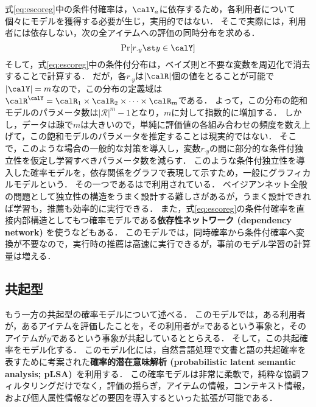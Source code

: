 式\eqref{eq:escoreg}中の条件付確率は，$\calY_a$に依存するため，各利用者について個々にモデルを獲得する必要が生じ，実用的ではない．
そこで実際には，利用者には依存しない，次の全アイテムへの評価の同時分布を求める．
\begin{equation}
\Pr[r_{\cdot y}\st y\in \calY]
\label{eq:jprob}
\end{equation}
そして，式\eqref{eq:escoreg}中の条件付分布は，ベイズ則と不要な変数を周辺化で消去することで計算する．
だが，各$r_{\cdot y}$は$|\calR|$個の値をとることが可能で$|\calY|=m$なので，この分布の定義域は$\calR^{\calY}=\calR_{1}\times\calR_{2}\times\dotsb\times\calR_{m}$である．
よって，この分布の飽和モデルのパラメータ数は$|\mathcal{R}|^m-1$となり，$m$に対して指数的に増加する．
しかし，データは疎で$m$は大きいので，単純に評価値の各組み合わせの頻度を数え上げて，この飽和モデルのパラメータを推定することは現実的ではない．
そこで，このような場合の一般的な対策を導入し，変数$r_{\cdot y}$の間に部分的な条件付独立性を仮定し学習すべきパラメータ数を減らす．
このような条件付独立性を導入した確率モデルを，依存関係をグラフで表現して示すため，一般にグラフィカルモデルという．
その一つである\cite{jb:037:00}は\cite{uai:98:01}で利用されている．
ベイジアンネット全般の問題として独立性の構造をうまく設計する難しさがあるが，うまく設計できれば学習も，推薦も効率的に実行できる．
また，式\eqref{eq:escoreg}の条件付確率を直接内部構造としてもつ確率モデルである\textbf{依存性ネットワーク (dependency network) }を使う\cite{jmlr:00:01}などもある．
このモデルでは，同時確率から条件付確率へ変換が不要なので，実行時の推薦は高速に実行できるが，事前のモデル学習の計算量は増える．

\subsection{共起型}

もう一方の共起型の確率モデルについて述べる．
このモデルでは，ある利用者が，あるアイテムを評価したことを，その利用者が$x$であるという事象と，そのアイテムが$y$であるという事象が共起しているととらえる．
そして，この共起確率をモデル化する．
このモデル化には，自然言語処理で文書と語の共起確率を表すために考案された\textbf{確率的潜在意味解析 (probabilistic latent semantic analysis; pLSA)}~\cite{uai:99:01}を利用する．
この確率モデルは非常に柔軟で，純粋な協調フィルタリングだけでなく，評価の揺らぎ，アイテムの情報，コンテキスト情報，および個人属性情報などの要因を導入するといった拡張が可能である．

